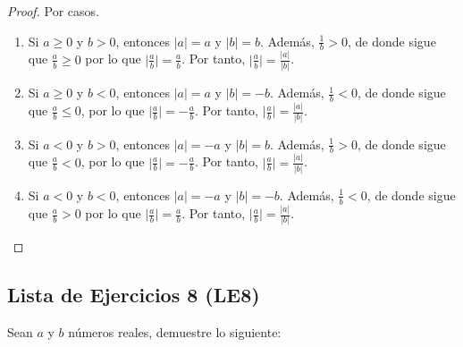 \documentclass[11pt]{article}
\newcommand{\N}{\mathbb{N}}
\newcommand{\Z}{\mathbb{Z}}
\newcommand{\bfit}[1]{\textbf{\textit{#1}}}
\let\set\Set
\let\union\cup
\begin{document}
\begin{enumerate}[label=\alph*)]
\vspace{-1em}\begin{proof} Por casos.
    \begin{enumerate}[label=\roman*)]
        \item Si $a \geq 0$ y $b>0$, entonces $|a|=a$ y $|b|=b$. Además, $\frac{1}{b} >0$, de donde sigue que $\frac{a}{b} \geq 0$ por lo que $\big| \frac{a}{b} \big| = \frac{a}{b}$. Por tanto, $ \big| \frac{a}{b} \big| = \frac{|a|}{|b|}$.
        \item Si $a \geq 0$ y $b<0$, entonces $|a|=a$ y $|b|=-b$. Además, $\frac{1}{b} <0$, de donde sigue que $\frac{a}{b} \leq 0$, por lo que $\big| \frac{a}{b} \big| =- \frac{a}{b}$. Por tanto, $ \big| \frac{a}{b} \big| = \frac{|a|}{|b|}$.
        \item Si $a<0$ y $b>0$, entonces $|a|=-a$ y $|b|=b$. Además, $\frac{1}{b} >0$, de donde sigue que $\frac{a}{b} < 0$, por lo que $\big| \frac{a}{b} \big| =- \frac{a}{b}$. Por tanto, $ \big| \frac{a}{b} \big| = \frac{|a|}{|b|}$.
        \item Si $a<0$ y $b<0$, entonces $|a|=-a$ y $|b|=-b$. Además, $\frac{1}{b} <0$, de donde sigue que $\frac{a}{b} > 0$ por lo que $\big| \frac{a}{b} \big| = \frac{a}{b}$. Por tanto, $ \big| \frac{a}{b} \big| = \frac{|a|}{|b|}$. \qedhere
    \end{enumerate}    
\end{proof} \vspace{-1em}

\end{enumerate}




\subsection*{Lista de Ejercicios 8 (LE8)}

Sean $a$ y $b$ números reales, demuestre lo siguiente:
\end{document}
